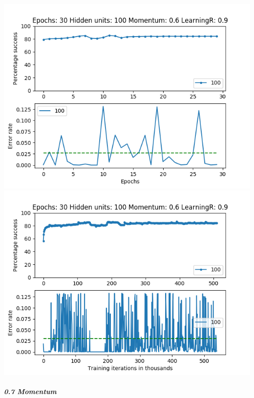 \documentclass[11pt]{article}
\makeatletter
\def\maxwidth{\ifdim\Gin@nat@width>\linewidth\linewidth
    \else\Gin@nat@width\fi}
\let\Oldincludegraphics\includegraphics
\renewcommand{\includegraphics}[1]{\Oldincludegraphics[width=.8\maxwidth]{#1}}
\makeatother
\begin{document}
\includegraphics{Experiment2/E2_NN_Epoch_Momentum_0.6_30Epochs_100Hiddenunits.png}
\includegraphics{Experiment2/E2_NN_Training_Momentum_0.6_30Epochs_100Hiddenunits.png}

\hypertarget{momentum-7}{%
\subparagraph{0.7 Momentum}\label{momentum-7}}
\end{document}
